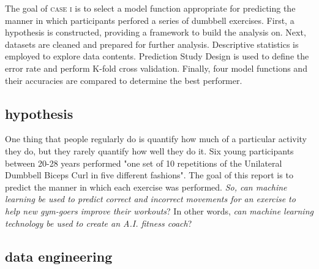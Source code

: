 \documentclass[10pt, twoside]{article}
\begin{document}
\noindent
The goal of \textsc{case i} is to select a model function appropriate for predicting the manner in
which participants perfored a series of dumbbell exercises. First, a hypothesis is constructed,
providing a framework to build the analysis on. Next, datasets are cleaned and prepared for
further analysis. Descriptive statistics is employed to explore data contents. Prediction
Study Design is used to define the error rate and perform K-fold cross validation. Finally,
four model functions and their accuracies are compared to determine the best performer.
\bigskip

\begin{center}
\subsection{hypothesis}
\vspace{-3ex}
\end{center}

\noindent
One thing that people regularly do is quantify how much of a particular activity they
do, but they rarely quantify how well they do it. Six young participants between 20-28 years
performed "one set of 10 repetitions of the Unilateral Dumbbell Biceps Curl in five
different fashions". The goal of this report is to predict the manner in which each exercise
was performed. \emph{So, can machine learning be used to predict correct and incorrect movements
for an exercise to help new gym-goers improve their workouts}? In other words, \emph{can machine
learning technology be used to create an A.I. fitness coach}? 
\bigskip

\begin{center}
\subsection{data engineering}
\vspace{-3ex}
\end{center}
\end{document}
